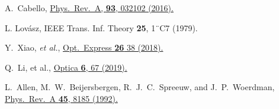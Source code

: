 \documentclass[prl,letterpaper,english,reprint,nofootinbib,aps,superscriptaddress,showpacs,showkeys]{revtex4-1}
\theoremstyle{definition}
\theoremstyle{remark}
\begin{document}
\begin{thebibliography}{10}
 A.~Cabello,
 \href{https://journals.aps.org/pra/pdf/10.1103/PhysRevA.93.032102}
 {Phys.~Rev.~A, \textbf{93}, 032102 (2016).}

L. Lov\'asz,
IEEE Trans. Inf. Theory \textbf{25}, 1¨C7 (1979).

 Y.~Xiao, \emph{et al.},
 \href{https://www.osapublishing.org/oe/abstract.cfm?uri=oe-26-1-32}
 {Opt.~Express \textbf{26} 38 (2018).}

 Q.~Li, et al.,
 \href{https://www.osapublishing.org/optica/abstract.cfm?uri=optica-6-1-67&origin=search}
 {Optica \textbf{6}, 67 (2019).}


 L.~Allen, M.~W.~Beijersbergen, R.~J.~C.~Spreeuw, and J.~P.~Woerdman,
 \href{https://journals.aps.org/pra/pdf/10.1103/PhysRevA.45.8185}
 {Phys.~Rev.~A \textbf{45}, 8185 (1992).}








\end{thebibliography}
\end{document}
